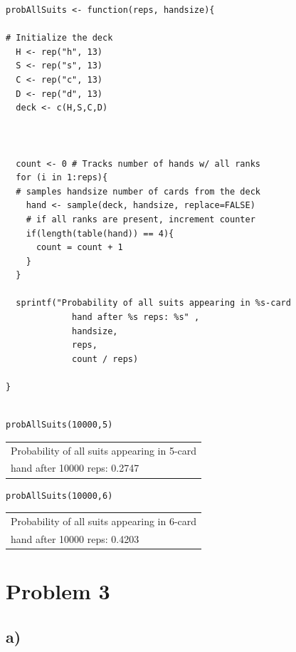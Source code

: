 \documentclass[11pt]{article}
\begin{document}
\begin{verbatim}
probAllSuits <- function(reps, handsize){

# Initialize the deck
  H <- rep("h", 13)
  S <- rep("s", 13)
  C <- rep("c", 13)
  D <- rep("d", 13)
  deck <- c(H,S,C,D)



  count <- 0 # Tracks number of hands w/ all ranks
  for (i in 1:reps){
  # samples handsize number of cards from the deck
    hand <- sample(deck, handsize, replace=FALSE)
    # if all ranks are present, increment counter
    if(length(table(hand)) == 4){
      count = count + 1
    }
  }

  sprintf("Probability of all suits appearing in %s-card 
             hand after %s reps: %s" ,
             handsize,
             reps,
             count / reps)

}


\end{verbatim}


\begin{verbatim}
probAllSuits(10000,5)
\end{verbatim}

\begin{center}
\begin{tabular}{l}
Probability of all suits appearing in 5-card\\
hand after 10000 reps: 0.2747\\
\end{tabular}
\end{center}

\begin{verbatim}
probAllSuits(10000,6)
\end{verbatim}

\begin{center}
\begin{tabular}{l}
Probability of all suits appearing in 6-card\\
hand after 10000 reps: 0.4203\\
\end{tabular}
\end{center}

\section*{Problem 3}
\label{sec:org4436f84}
\subsection*{a)}
\label{sec:org57fc108}
\end{document}
